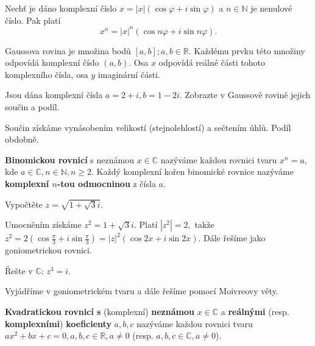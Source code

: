 \begin{veta}
    Nechť je dáno komplexní číslo $x=|x|(\cos \varphi + i \sin \varphi)$ a $n\in \mathbb N$
    je nenulové číslo. Pak platí
    $$x^n = |x|^n (\cos n\varphi + i \sin n \varphi).$$
\end{veta}

\begin{pozn}
    Gaussova rovina je množina bodů $[a,b]; a,b \in \mathbb R$.
    Každému prvku této množiny odpovídá komplexní číslo $(a,b).$ Osa $x$ odpovídá
    reálné části tohoto komplexního čísla, osa $y$ imaginární části.
\end{pozn}

\begin{priklad}
Jsou dána komplexní čísla $a=2+i,b=1-2i$. Zobrazte v Gaussově rovině jejich součin a podíl.
\end{priklad}

\begin{reseni}
Součin získáme vynásobením velikostí (stejnolehlostí) a sečtením úhlů. Podíl obdobně.
\end{reseni}

\begin{definition}
\textbf{Binomickou rovnicí} s neznámou $x\in \mathbb C$ nazýváme každou rovnici
tvaru $x^n=a$, kde $a\in \mathbb C,n\in \mathbb N, n\geq 2.$ Každý komplexní
kořen binomické rovnice nazýváme \textbf{komplexní $n$-tou odmocninou} z čísla $a.$
\end{definition}

\begin{priklad}
Vypočtěte $z=\sqrt{1+\sqrt{3}i }. $
\end{priklad}

\begin{reseni}
Umocněním získáme $z^2=1+\sqrt{3}i. $ Platí $|z^2|=2,$ takže $z^2=2(\cos \frac{\pi}{3}+i\sin \frac{\pi}{3})=|z|^2(\cos 2x+i\sin 2x)$.
Dále řešíme jako goniometrickou rovnici.
\end{reseni}

\begin{priklad}
Řešte v $\mathbb C$: $z^3=i.$
\end{priklad}

\begin{reseni}
Vyjádříme v goniometrickém tvaru a dále řešíme pomocí Moivreovy věty.
\end{reseni}

\begin{definition}
\textbf{Kvadratickou rovnicí s} (komplexní) \textbf{neznámou} $x\in \mathbb C$ a
\textbf{reálnými} (resp. \textbf{komplexními}) \textbf{koeficienty} $a,b,c$
nazýváme každou rovnici tvaru
$ax^2+bx+c=0,a,b,c\in \mathbb R,a\ne0$ (resp. $a,b,c \in \mathbb C,a\ne 0$).
\end{definition}

